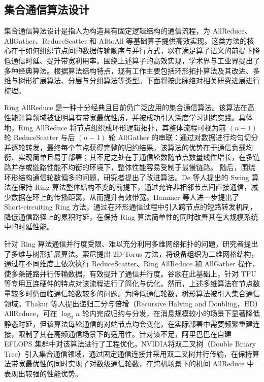 \subsection{集合通信算法设计}
                                                                          
集合通信算法设计是指人为构造具有固定逻辑结构的通信流程，为 AllReduce、AllGather、ReduceScatter 和 AlltoAll 等基础算子提供高效实现。这类方法的核心在于如何组织节点间的数据传输顺序与并行方式，以在满足算子语义的前提下降低通信时延、提升带宽利用率。围绕上述算子的高效实现，学术界与工业界提出了多种经典算法。根据算法结构特点，现有工作主要包括环形拓扑算法及其改进、多维与树形扩展算法、分层与分组算法等类型。下面将按此脉络对相关研究进展进行梳理。

Ring AllReduce 是一种十分经典且目前仍广泛应用的集合通信算法。该算法在高性能计算领域被证明具有带宽最优性质\cite{patarasuk2009bandwidth}，并被成功引入深度学习训练实践\cite{gibiansky2017hpc}。具体地，Ring AllReduce 将节点组织成环形逻辑拓扑，其整体流程可视为前 $(n-1)$ 轮 ReduceScatter 与后 $(n-1)$ 轮 AllGather 的串联：通过对数据进行均匀切分并逐轮转发，最终每个节点获得完整的归约结果。该算法的优势在于通信负载均衡、实现简单且易于部署；其不足之处在于通信轮数随节点数量线性增长，在多链路并存或链路性能不均衡的环境下，整体性能容易受制于最慢链路。
随后，围绕环形结构通信轮数偏多的问题，研究者提出了改进算法。De 等人\cite{de2024swing}提出的 Swing 算法在保持 Ring 算法整体结构不变的前提下，通过允许非相邻节点间直接通信，减少数据在环上的传播距离，从而提升有效带宽。Hammer 等人\cite{hammer2025short}进一步提出了 Short-circuiting Ring 方法，通过在环形通信过程中引入跨节点的短路转发机制，降低通信路径上的累积时延，在保持 Ring 算法简单性的同时改善其在大规模系统中的时延性能。

针对 Ring 算法通信并行度受限、难以充分利用多维网络拓扑的问题，研究者提出了多维与树形扩展算法。索尼提出 2D-Torus 方法\cite{mikami2018massively}，将设备组织为二维网格结构，通过在不同维度上依次执行 ReduceScatter、Ring AllReduce 和 AllGather 操作，使多条链路并行传输数据，有效提升了通信并行度。谷歌在此基础上，针对 TPU 等专用互连硬件的特点对该流程进行了简化与优化\cite{ying2018image}。然而，上述多维算法在节点数量较多时仍面临通信轮数较多的问题。为降低通信轮数，树形算法被引入集合通信领域。Thakur 等人\cite{thakur2005optimization}提出递归二分与倍增（Recursive Halving and Doubling，HD）AllReduce，可在 $\log_2 n$ 轮内完成归约与分发，在消息规模较小的场景下显著降低静态时延，但该算法每轮通信的对端节点均会变化，在实际部署中需要频繁重建连接，限制了其在高频通信场景下的适用性。针对该不足，阿里巴巴在自建 EFLOPS 集群中对该算法进行了工程优化\cite{dong2020eflops}。NVIDIA将双二叉树（Double Binary Tree）\cite{sanders2009two}引入集合通信领域，通过固定通信连接并采用双二叉树并行传输，在保持算法带宽最优性的同时实现了对数级通信轮数，在跨机场景下的机间 AllReduce 中表现出较强的性能优势。

